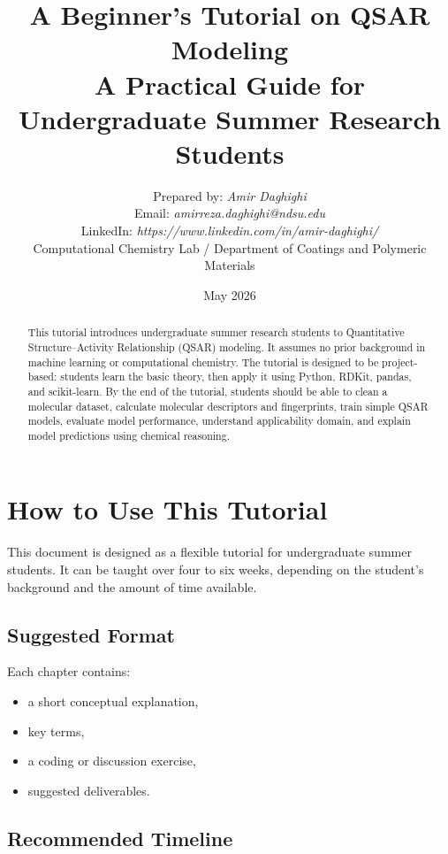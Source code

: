 \documentclass[11pt]{report}
\title{
    \textbf{A Beginner's Tutorial on QSAR Modeling}\\
    \large A Practical Guide for Undergraduate Summer Research Students
}
\author{
    Prepared by: \textit{Amir Daghighi}\\
    Email: \textit{amirreza.daghighi@ndsu.edu}\\
    LinkedIn: \textit{https://www.linkedin.com/in/amir-daghighi/}\\[0.5em]
    Computational Chemistry Lab / Department of Coatings and Polymeric Materials
}
\date{May 2026}
\newenvironment{Important note}{\begin{quote}\color{red}\textbf{Important note:} }{\end{quote}}
\begin{document}
\maketitle

\begin{abstract}
This tutorial introduces undergraduate summer research students to Quantitative Structure--Activity Relationship (QSAR) modeling. It assumes no prior background in machine learning or computational chemistry. The tutorial is designed to be project-based: students learn the basic theory, then apply it using Python, RDKit, pandas, and scikit-learn. By the end of the tutorial, students should be able to clean a molecular dataset, calculate molecular descriptors and fingerprints, train simple QSAR models, evaluate model performance, understand applicability domain, and explain model predictions using chemical reasoning.
\end{abstract}

\tableofcontents

\chapter*{How to Use This Tutorial}

This document is designed as a flexible tutorial for undergraduate summer students. It can be taught over four to six weeks, depending on the student's background and the amount of time available.

\section*{Suggested Format}

Each chapter contains:
\begin{itemize}[leftmargin=*]
    \item a short conceptual explanation,
    \item key terms,
    \item a coding or discussion exercise,
    \item suggested deliverables.
\end{itemize}

\section*{Recommended Timeline}
\end{document}
